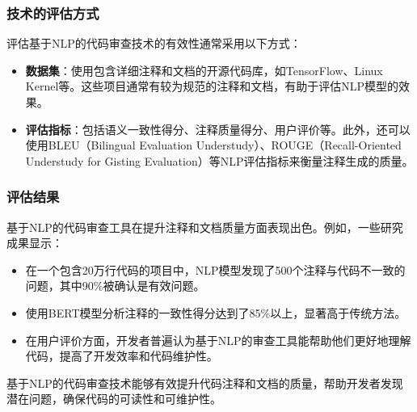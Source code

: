 \documentclass{article}
\begin{document}
\subsubsection{技术的评估方式}

评估基于NLP的代码审查技术的有效性通常采用以下方式：

\begin{itemize}
    \item \textbf{数据集}：使用包含详细注释和文档的开源代码库，如TensorFlow、Linux Kernel等。这些项目通常有较为规范的注释和文档，有助于评估NLP模型的效果。
    \item \textbf{评估指标}：包括语义一致性得分、注释质量得分、用户评价等。此外，还可以使用BLEU（Bilingual Evaluation Understudy）、ROUGE（Recall-Oriented Understudy for Gisting Evaluation）等NLP评估指标来衡量注释生成的质量。
\end{itemize}

\subsubsection{评估结果}

基于NLP的代码审查工具在提升注释和文档质量方面表现出色。例如，一些研究成果显示：

\begin{itemize}
    \item 在一个包含20万行代码的项目中，NLP模型发现了500个注释与代码不一致的问题，其中90\%被确认是有效问题。
    \item 使用BERT模型分析注释的一致性得分达到了85\%以上，显著高于传统方法。
    \item 在用户评价方面，开发者普遍认为基于NLP的审查工具能帮助他们更好地理解代码，提高了开发效率和代码维护性。
\end{itemize}

基于NLP的代码审查技术能够有效提升代码注释和文档的质量，帮助开发者发现潜在问题，确保代码的可读性和可维护性。
\end{document}
